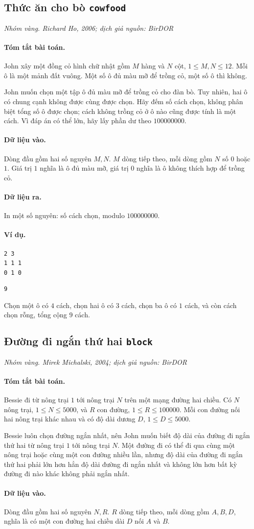 \documentclass[11pt]{article}
\newcommand{\problem}[4]{%
  \subsection[#1 (#2)]{#1 \hfill {\normalsize\texttt{#2}}}%
  \noindent\textit{#3. #4}\par\smallskip
}
\newcommand{\iosec}[1]{\paragraph{#1}}
\begin{document}
\problem{Thức ăn cho bò}{cowfood}{Nhóm vàng}{Richard Ho, 2006; dịch giả nguồn: BirDOR}

\iosec{Tóm tắt bài toán.}
John xây một đồng cỏ hình chữ nhật gồm \(M\) hàng và \(N\) cột,
\(1\le M,N\le 12\). Mỗi ô là một mảnh đất vuông. Một số ô đủ màu mỡ để trồng
cỏ, một số ô thì không.

John muốn chọn một tập ô đủ màu mỡ để trồng cỏ cho đàn bò. Tuy nhiên, hai ô
có chung cạnh không được cùng được chọn. Hãy đếm số cách chọn, không phân biệt
tổng số ô được chọn; cách không trồng cỏ ở ô nào cũng được tính là một cách.
Vì đáp án có thể lớn, hãy lấy phần dư theo \(100000000\).

\iosec{Dữ liệu vào.}
Dòng đầu gồm hai số nguyên \(M,N\). \(M\) dòng tiếp theo, mỗi dòng gồm \(N\)
số \(0\) hoặc \(1\). Giá trị \(1\) nghĩa là ô đủ màu mỡ, giá trị \(0\) nghĩa
là ô không thích hợp để trồng cỏ.

\iosec{Dữ liệu ra.}
In một số nguyên: số cách chọn, modulo \(100000000\).

\iosec{Ví dụ.}
\begin{verbatim}
2 3
1 1 1
0 1 0
\end{verbatim}

\begin{verbatim}
9
\end{verbatim}

Chọn một ô có \(4\) cách, chọn hai ô có \(3\) cách, chọn ba ô có \(1\) cách,
và còn cách chọn rỗng, tổng cộng \(9\) cách.

\problem{Đường đi ngắn thứ hai}{block}{Nhóm vàng}{Mirek Michalski, 2004; dịch giả nguồn: BirDOR}

\iosec{Tóm tắt bài toán.}
Bessie đi từ nông trại \(1\) tới nông trại \(N\) trên một mạng đường hai
chiều. Có \(N\) nông trại, \(1\le N\le 5000\), và \(R\) con đường,
\(1\le R\le 100000\). Mỗi con đường nối hai nông trại khác nhau và có độ dài
dương \(D\), \(1\le D\le 5000\).

Bessie luôn chọn đường ngắn nhất, nên John muốn biết độ dài của đường đi ngắn
thứ hai từ nông trại \(1\) tới nông trại \(N\). Một đường đi có thể đi qua
cùng một nông trại hoặc cùng một con đường nhiều lần, nhưng độ dài của đường
đi ngắn thứ hai phải lớn hơn hẳn độ dài đường đi ngắn nhất và không lớn hơn
bất kỳ đường đi nào khác không phải ngắn nhất.

\iosec{Dữ liệu vào.}
Dòng đầu gồm hai số nguyên \(N,R\). \(R\) dòng tiếp theo, mỗi dòng gồm
\(A,B,D\), nghĩa là có một con đường hai chiều dài \(D\) nối \(A\) và \(B\).
\end{document}
